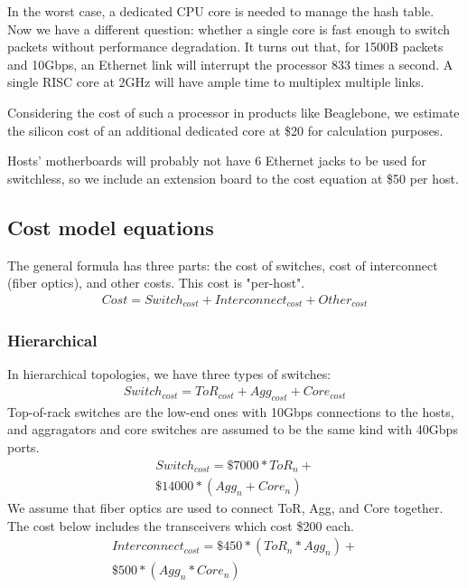 In the worst case, a dedicated CPU core is needed to manage the hash table. Now we have a different question: whether a single core is fast enough to switch packets without performance degradation. It turns out that, for 1500B packets and 10Gbps, an Ethernet link will interrupt the processor 833 times a second. A single RISC core at 2GHz will have ample time to multiplex multiple links.

Considering the cost of such a processor in products like Beaglebone, we estimate the silicon cost of an additional dedicated core at \$20 for calculation purposes.

Hosts' motherboards will probably not have 6 Ethernet jacks to be used for switchless, so we include an extension board to the cost equation at \$50 per host.
\vspace{-0.1in}
\subsection{Cost model equations}
The general formula has three parts: the cost of switches, cost of interconnect (fiber optics), and other costs. This cost is "per-host".
\vspace{-0.1in}
\begin{multline}
Cost = Switch_{cost} + Interconnect_{cost} + Other_{cost}
\end{multline}
\subsubsection{Hierarchical}
In hierarchical topologies, we have three types of switches:
\vspace{-0.1in}
\begin{multline}
Switch_{cost} = ToR_{cost} + Agg_{cost} + Core_{cost}
\end{multline}
Top-of-rack switches are the low-end ones with 10Gbps connections to the hosts, and aggragators and core switches are assumed to be the same kind with 40Gbps ports.
\vspace{-0.1in}
\begin{multline}
Switch_{cost} = \$7000 * ToR_n +\\
                \$14000 * (Agg_n + Core_n)
\end{multline}
We assume that fiber optics are used to connect ToR, Agg, and Core together. The cost below includes the transceivers which cost \$200 each.
\vspace{-0.1in}
\begin{multline}
Interconnect_{cost} = \$450 * (ToR_n * Agg_n) +\\
                      \$500 * (Agg_n * Core_n)
\end{multline}
